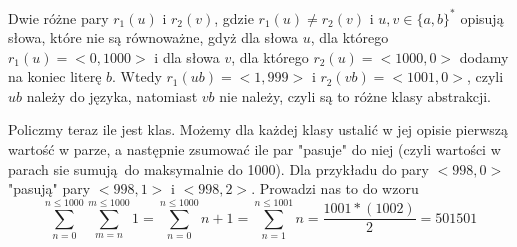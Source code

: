 \documentclass[a4paper]{article}
\newcommand{\set}[1]{\{#1\}}%
\begin{document}
Dwie różne pary $r_1(u)$ i $r_2(v)$, gdzie $r_1(u) \ne r_2(v)$ i $u, v \in \set{a,b}^*$ opisują słowa, które nie są równoważne, gdyż dla słowa $u$, dla którego $r_1(u) = <0, 1000>$ i dla słowa $v$, dla którego $r_2(u) = <1000, 0>$ dodamy na koniec literę $b$. Wtedy $r_1(ub) = <1, 999>$ i $r_2(vb) = <1001, 0>$, czyli $ub$ należy do języka, natomiast $vb$ nie należy, czyli są to różne klasy abstrakcji.

Policzmy teraz ile jest klas. Możemy dla każdej klasy ustalić w jej opisie pierwszą wartość w parze, a następnie zsumować ile par "pasuje" do niej (czyli wartości w parach sie sumują do maksymalnie do 1000). Dla przykładu do pary $<998, 0>$ "pasują" pary $<998, 1>$ i $<998, 2>$. Prowadzi nas to do wzoru
$$\sum_{n=0}^{n\leq1000}\sum_{m=n}^{m\leq 1000} 1 = \sum_{n=0}^{n \leq 1000} n + 1 = \sum_{n=1}^{n \leq 1001} n = \frac{1001 * (1002)}{2} = 501501$$
\end{document}
